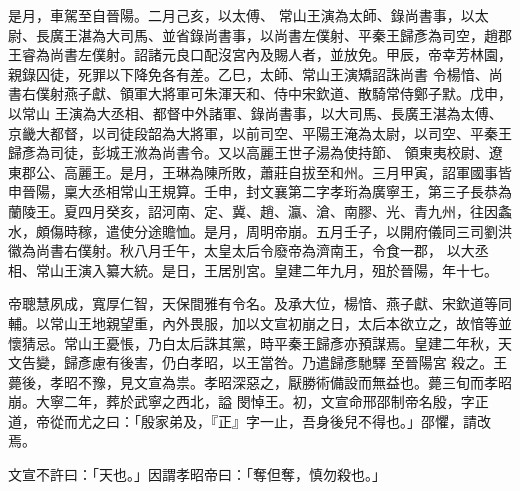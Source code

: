 \begin{pinyinscope}
 是月，車駕至自晉陽。二月己亥，以太傅、
 常山王演為太師、錄尚書事，以太尉、長廣王湛為大司馬、並省錄尚書事，以尚書左僕射、平秦王歸彥為司空，趙郡王睿為尚書左僕射。詔諸元良口配沒宮內及賜人者，並放免。甲辰，帝幸芳林園，親錄囚徒，死罪以下降免各有差。乙巳，太師、常山王演矯詔誅尚書
 令楊愔、尚書右僕射燕子獻、領軍大將軍可朱渾天和、侍中宋欽道、散騎常侍鄭子默。戊申，以常山
 王演為大丞相、都督中外諸軍、錄尚書事，以大司馬、長廣王湛為太傅、京畿大都督，以司徒段韶為大將軍，以前司空、平陽王淹為太尉，以司空、平秦王歸彥為司徒，彭城王浟為尚書令。又以高麗王世子湯為使持節、
 領東夷校尉、遼東郡公、高麗王。是月，王琳為陳所敗，蕭莊自拔至和州。三月甲寅，詔軍國事皆申晉陽，稟大丞相常山王規算。壬申，封文襄第二字孝珩為廣寧王，第三子長恭為蘭陵王。夏四月癸亥，詔河南、定、冀、趙、瀛、滄、南膠、光、青九州，往因螽水，頗傷時稼，遣使分途贍恤。是月，周明帝崩。五月壬子，以開府儀同三司劉洪徽為尚書右僕射。秋八月壬午，太皇太后令廢帝為濟南王，令食一郡，
 以大丞相、常山王演入纂大統。是日，王居別宮。皇建二年九月，殂於晉陽，年十七。



 帝聰慧夙成，寬厚仁智，天保間雅有令名。及承大位，楊愔、燕子獻、宋欽道等同輔。以常山王地親望重，內外畏服，加以文宣初崩之日，太后本欲立之，故愔等並懷猜忌。常山王憂悵，乃白太后誅其黨，時平秦王歸彥亦預謀焉。皇建二年秋，天文告變，歸彥慮有後害，仍白孝昭，以王當咎。乃遣歸彥馳驛
 至晉陽宮
 殺之。王薨後，孝昭不豫，見文宣為祟。孝昭深惡之，厭勝術備設而無益也。薨三旬而孝昭崩。大寧二年，葬於武寧之西北，謚
 閔悼王。初，文宣命邢邵制帝名殷，字正道，帝從而尤之曰：「殷家弟及，『正』字一止，吾身後兒不得也。」邵懼，請改焉。



 文宣不許曰：「天也。」因謂孝昭帝曰：「奪但奪，慎勿殺也。」



\end{pinyinscope}